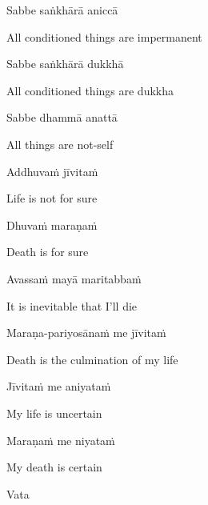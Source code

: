 Sabbe saṅkhārā aniccā

\begin{english}
  All conditioned things are impermanent
\end{english}

Sabbe saṅkhārā dukkhā

\begin{english}
  All conditioned things are dukkha
\end{english}

Sabbe dhammā anattā

\begin{english}
  All things are not-self\makeatletter\hyperlink{endnote104-appendix}\makeatother
\end{english}

\suttaRef{[Dhp 277-279]}

Addhuvaṁ jīvitaṁ

\begin{english}
  Life is not for sure
\end{english}

Dhuvaṁ maraṇaṁ

\begin{english}
  Death is for sure
\end{english}

Avassaṁ mayā maritabbaṁ

\begin{english}
  It is inevitable that I'll die
\end{english}

Maraṇa-pariyosānaṁ me jīvitaṁ

\begin{english}
  Death is the culmination of my life
\end{english}

Jīvitaṁ me aniyataṁ

\begin{english}
  My life is uncertain
\end{english}

Maraṇaṁ me niyataṁ

\begin{english}
  My death is certain
\end{english}

\suttaRef{[Dhp A]}

\clearpage

Vata

